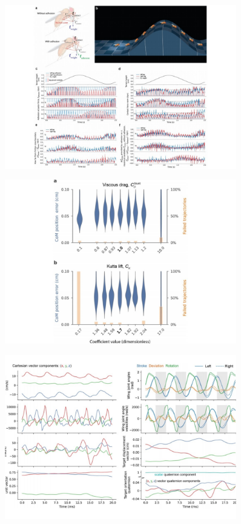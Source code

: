 \documentclass[sn-mathphys-num]{sn-jnl}%
\theoremstyle{thmstyleone}	%
\theoremstyle{thmstyletwo}	%
\theoremstyle{thmstylethree}	%
\begin{document}
\begin{figure}[!htb] 
	\centering
	\includegraphics[width=0.9\textwidth]{fig/extended_fig_3.pdf}
	\caption{}
	\label{fig:extended_fig_3}
\end{figure}


\begin{figure}[!htb] 
	\centering
	\includegraphics[width=0.9\textwidth]{fig/extended_fig_4.pdf}
	\caption{}
	\label{fig:extended_fig_4}
\end{figure}


\begin{figure}[!htb] 
	\centering
	\includegraphics[width=0.9\textwidth]{fig/extended_fig_5.pdf}
	\caption{}
	\label{fig:extended_fig_5}
\end{figure}
\end{document}
